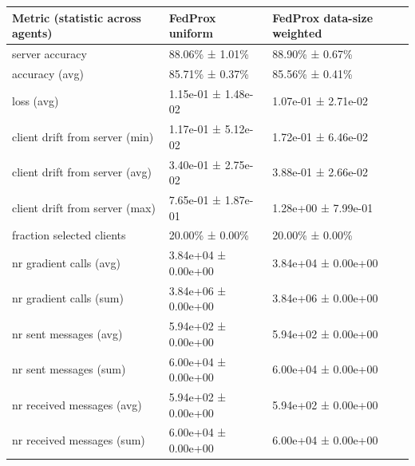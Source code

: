 \begin{tabular}{lll}
\hline
 Metric (statistic across agents)   & FedProx uniform     & FedProx data-size weighted   \\
\hline
 server accuracy                    & 88.06\% ± 1.01\%      & 88.90\% ± 0.67\%               \\
 accuracy (avg)                     & 85.71\% ± 0.37\%      & 85.56\% ± 0.41\%               \\
 loss (avg)                         & 1.15e-01 ± 1.48e-02 & 1.07e-01 ± 2.71e-02          \\
 client drift from server (min)     & 1.17e-01 ± 5.12e-02 & 1.72e-01 ± 6.46e-02          \\
 client drift from server (avg)     & 3.40e-01 ± 2.75e-02 & 3.88e-01 ± 2.66e-02          \\
 client drift from server (max)     & 7.65e-01 ± 1.87e-01 & 1.28e+00 ± 7.99e-01          \\
 fraction selected clients          & 20.00\% ± 0.00\%      & 20.00\% ± 0.00\%               \\
 nr gradient calls (avg)            & 3.84e+04 ± 0.00e+00 & 3.84e+04 ± 0.00e+00          \\
 nr gradient calls (sum)            & 3.84e+06 ± 0.00e+00 & 3.84e+06 ± 0.00e+00          \\
 nr sent messages (avg)             & 5.94e+02 ± 0.00e+00 & 5.94e+02 ± 0.00e+00          \\
 nr sent messages (sum)             & 6.00e+04 ± 0.00e+00 & 6.00e+04 ± 0.00e+00          \\
 nr received messages (avg)         & 5.94e+02 ± 0.00e+00 & 5.94e+02 ± 0.00e+00          \\
 nr received messages (sum)         & 6.00e+04 ± 0.00e+00 & 6.00e+04 ± 0.00e+00          \\
\hline
\end{tabular}